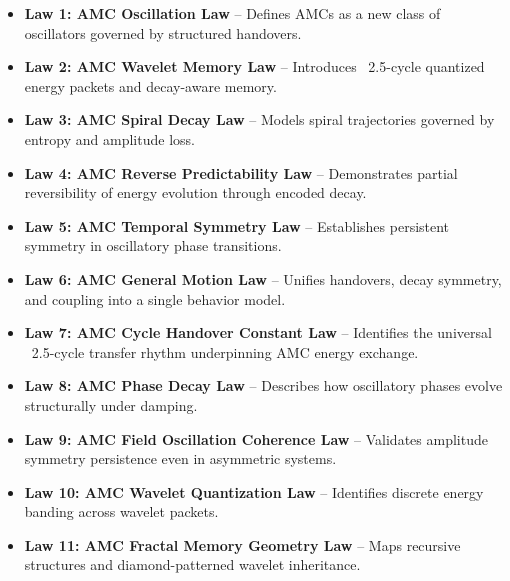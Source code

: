 \documentclass[10pt,aps,pre,onecolumn,superscriptaddress,notitlepage]{revtex4-2}
\begin{document}
\begin{itemize}

\item \textbf{Law 1: AMC Oscillation Law} – Defines AMCs as a new class of oscillators governed by structured handovers. \cite{karim2025oscillation}

\item \textbf{Law 2: AMC Wavelet Memory Law} – Introduces ~2.5-cycle quantized energy packets and decay-aware memory. \cite{karim2025waveletmemory}

\item \textbf{Law 3: AMC Spiral Decay Law} – Models spiral trajectories governed by entropy and amplitude loss. \cite{karim2025spiraldecay}

\item \textbf{Law 4: AMC Reverse Predictability Law} – Demonstrates partial reversibility of energy evolution through encoded decay. \cite{karim2025reversepredictability}

\item \textbf{Law 5: AMC Temporal Symmetry Law} – Establishes persistent symmetry in oscillatory phase transitions. \cite{karim2025temporalsymmetry}

\item \textbf{Law 6: AMC General Motion Law} – Unifies handovers, decay symmetry, and coupling into a single behavior model. \cite{karim2025generalmotion}

\item \textbf{Law 7: AMC Cycle Handover Constant Law} – Identifies the universal ~2.5-cycle transfer rhythm underpinning AMC energy exchange. \cite{karim2025cyclehandover}

\item \textbf{Law 8: AMC Phase Decay Law} – Describes how oscillatory phases evolve structurally under damping. \cite{karim2025phasedecay}

\item \textbf{Law 9: AMC Field Oscillation Coherence Law} – Validates amplitude symmetry persistence even in asymmetric systems. \cite{karim2025fieldcoherence}

\item \textbf{Law 10: AMC Wavelet Quantization Law} – Identifies discrete energy banding across wavelet packets. \cite{karim2025waveletquantization}

\item \textbf{Law 11: AMC Fractal Memory Geometry Law} – Maps recursive structures and diamond-patterned wavelet inheritance. \cite{karim2025fractalmemory}


\end{itemize}
\end{document}
